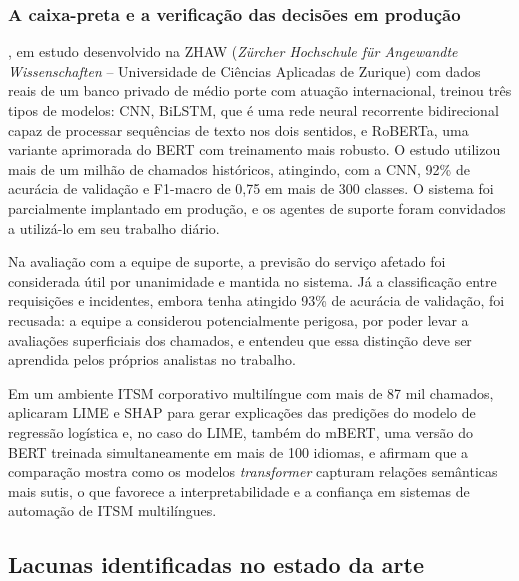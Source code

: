 \documentclass[
    12pt,                %
    openright,           %
    oneside,             %
    a4paper,             %
    english,             %
    brazil               %
]{abntex2}
\begin{document}
\subsubsection{A caixa-preta e a verificação das decisões em produção}
\label{subsubsec:helpdesk_caixapreta}

, em estudo desenvolvido na ZHAW (\textit{Zürcher Hochschule für Angewandte Wissenschaften} -- Universidade de Ciências Aplicadas de Zurique) com dados reais 
de um banco privado de médio porte com atuação internacional, treinou três tipos de modelos: CNN, 
BiLSTM, que é uma rede neural recorrente bidirecional capaz de 
processar sequências de texto nos dois sentidos, e RoBERTa, uma 
variante aprimorada do BERT com treinamento mais robusto. O estudo 
utilizou mais de um milhão de chamados históricos, atingindo, com a CNN, 
92\% de acurácia de validação e F1-macro de 0,75 em mais de 300 
classes. O sistema foi parcialmente implantado em produção, e os agentes 
de suporte foram convidados a utilizá-lo em seu trabalho diário. 

Na avaliação com a equipe de suporte, a previsão do serviço afetado foi considerada útil por unanimidade e mantida no sistema. Já a classificação entre requisições e incidentes, embora tenha atingido 93\% de acurácia de validação, foi recusada: a equipe a considerou potencialmente perigosa, por poder levar a avaliações superficiais dos chamados, e entendeu que essa distinção deve ser aprendida pelos próprios analistas no trabalho.

Em um ambiente ITSM corporativo multilíngue com mais de 87 mil chamados,  aplicaram LIME e 
SHAP para gerar explicações das predições do modelo de regressão logística e, no caso do LIME, 
também do mBERT, uma versão do BERT treinada simultaneamente 
em mais de 100 idiomas, e afirmam que a comparação mostra como os modelos \textit{transformer} capturam relações semânticas mais sutis, o que favorece a 
interpretabilidade e a confiança em sistemas de automação de ITSM multilíngues.

\subsection{Lacunas identificadas no estado da arte}
\label{subsec:sintese_lacunas}

\end{document}
